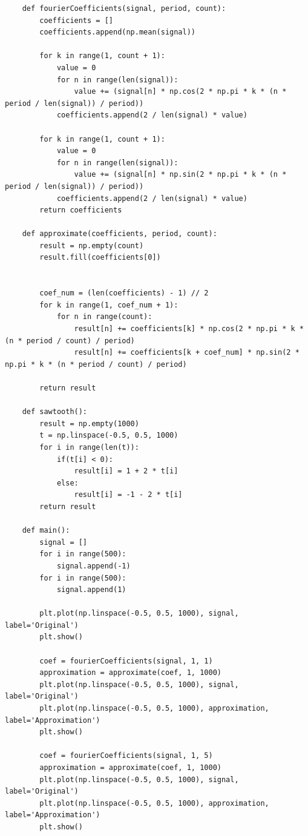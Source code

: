 \documentclass[10pt,a4paper, margin=1in]{article}
\begin{document}
\begin{enumerate}
\begin{lstlisting}
    def fourierCoefficients(signal, period, count):
        coefficients = []
        coefficients.append(np.mean(signal))

        for k in range(1, count + 1):
            value = 0
            for n in range(len(signal)):
                value += (signal[n] * np.cos(2 * np.pi * k * (n * period / len(signal)) / period))
            coefficients.append(2 / len(signal) * value)

        for k in range(1, count + 1):
            value = 0
            for n in range(len(signal)):
                value += (signal[n] * np.sin(2 * np.pi * k * (n * period / len(signal)) / period))
            coefficients.append(2 / len(signal) * value)
        return coefficients

    def approximate(coefficients, period, count):
        result = np.empty(count)
        result.fill(coefficients[0])


        coef_num = (len(coefficients) - 1) // 2
        for k in range(1, coef_num + 1):
            for n in range(count):
                result[n] += coefficients[k] * np.cos(2 * np.pi * k * (n * period / count) / period)
                result[n] += coefficients[k + coef_num] * np.sin(2 * np.pi * k * (n * period / count) / period)
        
        return result

    def sawtooth():
        result = np.empty(1000)
        t = np.linspace(-0.5, 0.5, 1000)
        for i in range(len(t)):
            if(t[i] < 0):
                result[i] = 1 + 2 * t[i]
            else:
                result[i] = -1 - 2 * t[i]
        return result

    def main():
        signal = []
        for i in range(500):
            signal.append(-1)
        for i in range(500):
            signal.append(1)

        plt.plot(np.linspace(-0.5, 0.5, 1000), signal, label='Original')
        plt.show()

        coef = fourierCoefficients(signal, 1, 1)
        approximation = approximate(coef, 1, 1000)
        plt.plot(np.linspace(-0.5, 0.5, 1000), signal, label='Original')
        plt.plot(np.linspace(-0.5, 0.5, 1000), approximation, label='Approximation')
        plt.show()

        coef = fourierCoefficients(signal, 1, 5)
        approximation = approximate(coef, 1, 1000)
        plt.plot(np.linspace(-0.5, 0.5, 1000), signal, label='Original')
        plt.plot(np.linspace(-0.5, 0.5, 1000), approximation, label='Approximation')
        plt.show()


\end{lstlisting}
\end{enumerate}
\end{document}

